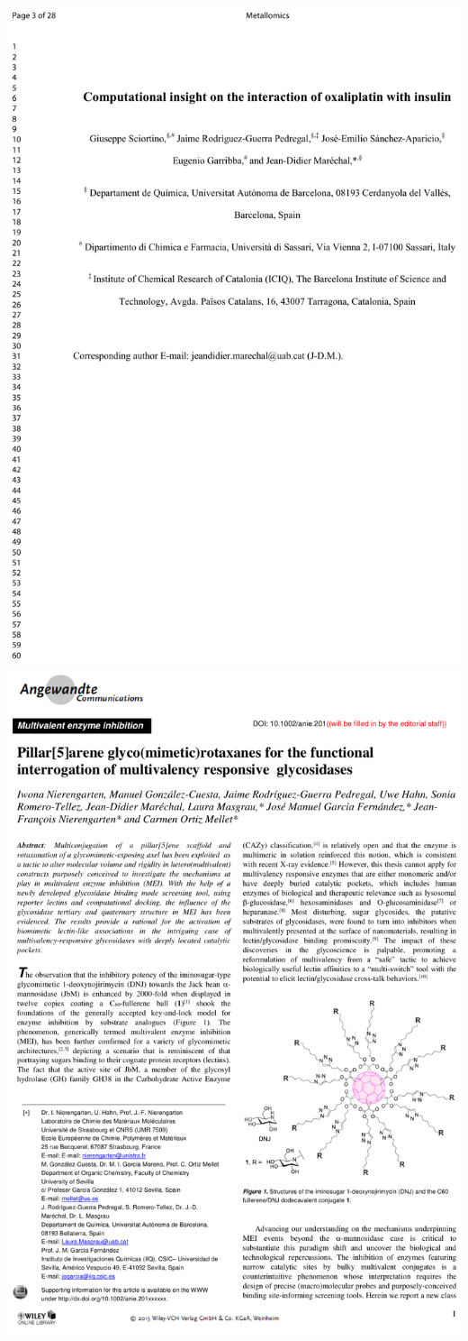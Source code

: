 \includegraphics[width=\textwidth]{figures/pubs/metallomics.pdf}
\clearpage
\includegraphics[width=\textwidth]{figures/pubs/rotaxanes.pdf}
\clearpage\thispagestyle{empty}\mbox{}\clearpage\thispagestyle{empty}
